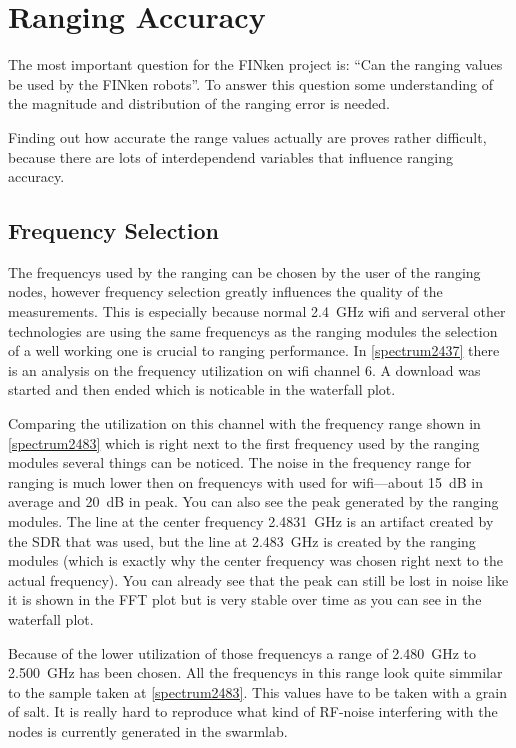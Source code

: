 \section{Ranging Accuracy}

The most important question for the FINken project is: \enquote{Can the ranging values be used by the FINken robots}.
To answer this question some understanding of the magnitude and distribution of the ranging error is needed.

Finding out how accurate the range values actually are proves rather difficult, because there are lots of interdependend variables that influence ranging accuracy.

\subsection{Frequency Selection}
\label{freqencyselection}
The frequencys used by the ranging can be chosen by the user of the ranging nodes,
however frequency selection greatly influences the quality of the measurements.
This is especially because normal \SI{2.4}{\giga\hertz} wifi and serveral other technologies are using the same frequencys as the ranging modules the selection of a well working one is crucial to ranging performance.
In \autoref{spectrum2437} there is an analysis on the frequency utilization on wifi channel 6.
A download was started and then ended which is noticable in the waterfall plot.

Comparing the utilization on this channel with the frequency range shown in \autoref{spectrum2483} which is right next to the first frequency used by the ranging modules several things can be noticed.
The noise in the frequency range for ranging is much lower then on frequencys with used for wifi—about \SI{15}{dB} in average and \SI{20}{dB} in peak.
You can also see the peak generated by the ranging modules.
The line at the center frequency \SI{2.4831}{\giga\hertz} is an artifact created by the SDR that was used, but the line at \SI{2.483}{\giga\hertz} is created by the ranging modules (which is exactly why the center frequency was chosen right next to the actual frequency).
You can already see that the peak can still be lost in noise like it is shown in the FFT plot but is very stable over time as you can see in the waterfall plot.

Because of the lower utilization of those frequencys a range of \SI{2.480}{\giga\hertz} to \SI{2.500}{\giga\hertz} has been chosen.
All the frequencys in this range look quite simmilar to the sample taken at \autoref{spectrum2483}.
This values have to be taken with a grain of salt.
It is really hard to reproduce what kind of RF-noise interfering with the nodes is currently generated in the swarmlab.

